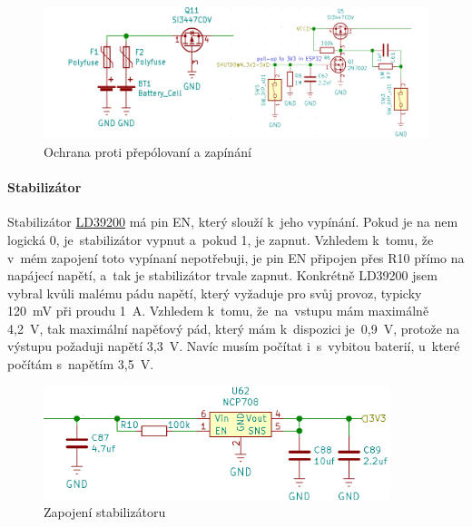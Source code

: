 \begin{figure}[h]
    \centering
    \includegraphics[width=\textwidth]{kapitoly/obrazky/E4/napajeni/ochrana_proti_prepolovani_a_zapinani.png}
    \caption{Ochrana proti přepólovaní a zapínání}
    \label{fig:E4-zapinani}
\end{figure}

\paragraph*{Stabilizátor}

Stabilizátor \href{https://datasheet.lcsc.com/szlcsc/1808280153_STMicroelectronics-LD39200PU33R_C222192.pdf}{LD39200} \parencite{ld39200} má pin EN, který slouží k~je\-ho vypínání. 
Pokud je na nem logická 0, je~stabilizátor vypnut a~pokud 1, je zapnut. Vzhledem k~tomu, že v~mém zapojení toto vypínaní nepotřebuji, je pin EN připojen 
přes R10 přímo na napájecí napětí, a~tak je stabilizátor trvale zapnut.
Konkrétně LD39200 jsem vybral kvůli malému pádu napětí, který vyžaduje pro svůj provoz, typicky 120~mV při proudu 1~A. Vzhledem k~tomu, že~na~vstupu 
mám maximálně 4,2~V, tak maximální napěťový pád, který mám k~dispozici je~0,9~V, protože na výstupu požaduji napětí 3,3~V. Navíc musím počítat 
i~s~vybitou baterií, u~které počítám s~napětím 3,5~V. %

\begin{figure}[h]
    \centering
    \includegraphics[width=0.9\textwidth]{kapitoly/obrazky/E4/napajeni/stabilizator.png}
    \caption{Zapojení stabilizátoru}
    \label{fig:E4-stabilizator}
\end{figure}

